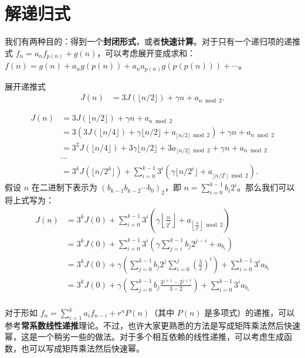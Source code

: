 \section{解递归式}
我们有两种目的：得到一个\textbf{封闭形式}，或者\textbf{快速计算}。对于只有一个递归项的递推式 $f_n=a_n f_{p(n)}+g(n)$，可以考虑展开变成求和：$f(n)=g(n)+a_n g(p(n))+a_na_{p(n)}g(p(p(n)))+\cdots$。
\begin{example}
    展开递推式
    \[
\begin{aligned}
    J(n)&=3J(\lfloor n/2\rfloor)+\gamma n+a_{n\bmod 2}.
\end{aligned}
\]
\end{example}
\begin{solution}
    \[
\begin{aligned}
    J(n)&=3J(\lfloor n/2\rfloor)+\gamma n+a_{n\bmod 2}\\
    &=3\left(3J(\lfloor n/4\rfloor)+\gamma \lfloor n/2\rfloor + a_{\lfloor n/2\rfloor\bmod 2}\right)+\gamma n+a_{n\bmod 2}\\
    &=3^2J(\lfloor n/4\rfloor)+3\gamma \lfloor n/2\rfloor + 3a_{\lfloor n/2\rfloor\bmod 2}+\gamma n+a_{n\bmod 2}\\
    &\cdots\\
    &=3^kJ(\lfloor n/2^k\rfloor)+\sum_{i=0}^{k-1}3^i\left(\gamma \lfloor n/2^i\rfloor + a_{\lfloor n/2^i\rfloor\bmod 2}\right).
\end{aligned}
    \]
    假设 $n$ 在二进制下表示为 $(b_{k-1}b_{k-2}\cdots b_0)_2$，即 $n = \sum_{i=0}^{k-1} b_i 2^i$。那么我们可以将上式写为：
\[
\begin{aligned}
    J(n) &= 3^k J(0) + \sum_{i=0}^{k-1} 3^i \left( \gamma \left\lfloor \frac{n}{2^i} \right\rfloor + a_{\left\lfloor \frac{n}{2^i} \right\rfloor \bmod 2} \right) \\
    &= 3^k J(0) + \sum_{i=0}^{k-1} 3^i \left( \gamma \sum_{j=i}^{k-1} b_j 2^{j-i} + a_{b_i} \right)\\
    &= 3^k J(0) + \gamma\left(\sum_{j=0}^{k-1} b_j 2^j \sum_{i=0}^{j} \left( \frac{3}{2} \right)^i\right) + \sum_{i=0}^{k-1} 3^i a_{b_i} \\
    &= 3^k J(0) + \gamma\left(\sum_{j=0}^{k-1} b_j \frac{3^{j+1}-2^{j+1}}{3-2}\right) + \sum_{i=0}^{k-1} 3^i a_{b_i} \\
\end{aligned}
\]
\end{solution}

对于形如 $f_n=\sum_{i=1}^k a_i f_{n-i}+r^nP(n)$（其中 $P(n)$ 是多项式）的递推，可以参考\textbf{常系数线性递推}理论。不过，也许大家更熟悉的方法是写成矩阵乘法然后快速幂，这是一个稍劣一些的做法。对于多个相互依赖的线性递推，可以考虑生成函数，也可以写成矩阵乘法然后快速幂。

